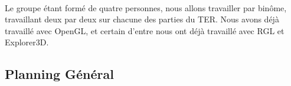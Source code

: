 \paragraph{} 
Le groupe étant formé de quatre personnes, nous allons travailler par binôme, travaillant deux par deux sur chacune des parties du TER. Nous avons déjà travaillé avec OpenGL, et certain d'entre nous ont déjà travaillé avec RGL et Explorer3D. 

\newpage
\subsection{Planning Général}
\newpage